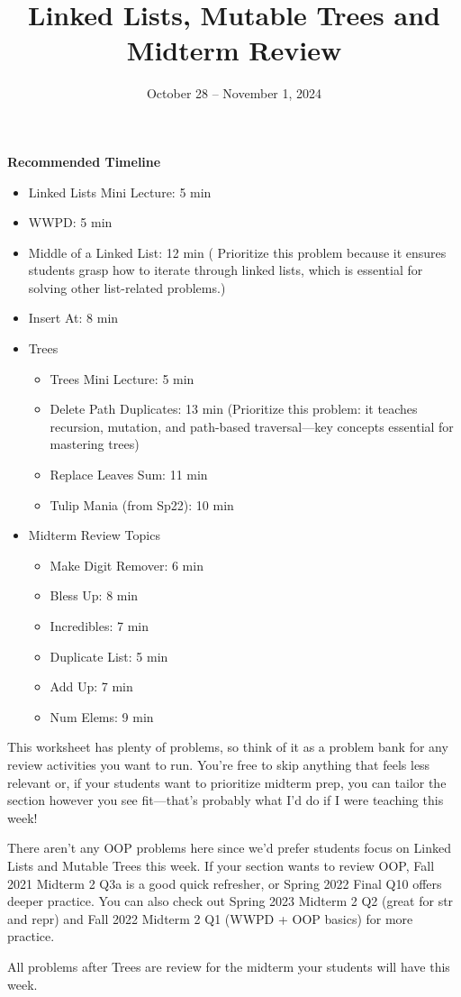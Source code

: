 \documentclass{exam}
\title{Linked Lists, Mutable Trees and Midterm Review}
\date{October 28 -- November 1, 2024}
\begin{document}
\maketitle
\begin{guide}
\raggedright
    \textbf{Recommended Timeline}
    \begin{itemize}
        \item Linked Lists Mini Lecture: 5 min
        \item WWPD: 5 min
        \item Middle of a Linked List: 12 min ( Prioritize this problem because it ensures students grasp how to iterate through linked lists, which is essential for solving other list-related problems.)
        \item Insert At: 8 min
    \end{itemize}
\begin{itemize}
    \item Trees
    \begin{itemize}
        \item Trees Mini Lecture: 5 min
        \item Delete Path Duplicates: 13 min (Prioritize this problem: it teaches recursion, mutation, and path-based traversal—key concepts essential for mastering trees)
        \item Replace Leaves Sum: 11 min 
        \item Tulip Mania (from Sp22): 10 min
    \end{itemize}
    \item Midterm Review Topics
    \begin{itemize}
        \item Make Digit Remover: 6 min
        \item Bless Up: 8 min
        \item Incredibles: 7 min
        \item Duplicate List: 5 min
        \item Add Up: 7 min
        \item Num Elems: 9 min
    \end{itemize}
\end{itemize}
    This worksheet has plenty of problems, so think of it as a problem bank for any review activities you want to run. You’re free to skip anything that feels less relevant or, if your students want to prioritize midterm prep, you can tailor the section however you see fit—that’s probably what I’d do if I were teaching this week!

    There aren’t any OOP problems here since we’d prefer students focus on Linked Lists and Mutable Trees this week. If your section wants to review OOP, Fall 2021 Midterm 2 Q3a is a good quick refresher, or Spring 2022 Final Q10 offers deeper practice. You can also check out Spring 2023 Midterm 2 Q2 (great for str and repr) and Fall 2022 Midterm 2 Q1 (WWPD + OOP basics) for more practice.

    All problems after Trees are review for the midterm your students will have this week.
\end{guide}
\end{document}
